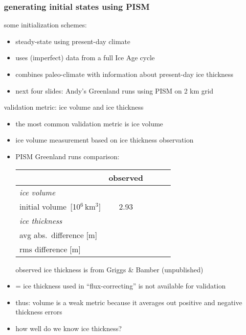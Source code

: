 \documentclass[hide notes,intlimits]{beamer}
\begin{document}
\begin{frame}
  \frametitle{generating initial states using PISM}
  \begin{block}{some initialization schemes:}
    \begin{itemize}
    \item {\color{dark blue}{constant-climate}} steady-state using
present-day climate
    \item {\color{dark orange}{paleo-climate}} uses (imperfect) data from a full Ice Age cycle
    \item {\color{dark violet}{flux-corrected paleo-climate}} combines
paleo-climate with information about present-day ice thickness
    \end{itemize}
  \end{block}

  \begin{itemize}
  \item next four slides: Andy's Greenland runs using PISM on 2 km grid
  \end{itemize}
\end{frame}


\begin{frame}{validation metric: ice volume and ice thickness}

\begin{itemize}
\item the most common validation metric is ice volume
\item ice volume measurement based on ice thickness observation
\item PISM Greenland runs comparison:

\vspace{1em}

{\scriptsize{
\begin{tabular}{l c c c c}
\hline
  & observed & \color{dark blue}{constant-climate} & \color{dark orange}{paleo-climate}  & \color{dark violet}{flux-corrected}\\
\hline
\emph{ice volume}\\
initial volume\, [10$^{6}$\,km$^{3}$] & 2.93 & \color{dark blue}{3.18} & \color{dark orange}{3.37} & \color{dark violet}{X} \medskip \\

\emph{ice thickness}\\
avg abs.~difference [m] &  & \color{dark blue}{99} & \color{dark orange}{121} & \color{dark violet}{X}\\
rms difference [m] & & \color{dark blue}{199} & \color{dark orange}{244} & \color{dark violet}{X}\\
\hline
\end{tabular}
observed ice thickness is from Griggs \& Bamber (unpublished)
}}
\scriptsize
\item[\color{dark violet}{X}] = ice thickness used in ``flux-correcting'' is not available for validation
\normalsize
\bigskip

\item thus: volume is a weak metric because it averages out positive and negative thickness errors
\item how well do we know ice thickness?
\end{itemize}
\end{frame}
\end{document}
